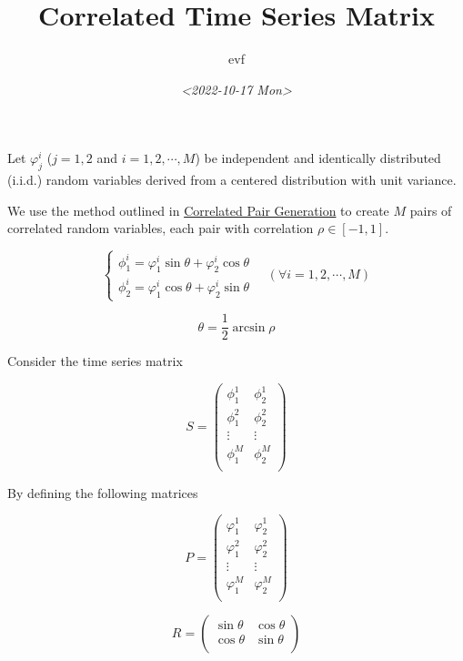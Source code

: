\documentclass[11pt]{article}
\author{evf}
\date{\textit{<2022-10-17 Mon>}}
\title{Correlated Time Series Matrix}
\begin{document}
\maketitle
\tableofcontents

Let \(\varphi_j^i\) (\(j=1,2\) and \(i=1,2,\cdots,M\)) be independent and identically distributed (i.i.d.) random variables derived from a centered distribution with unit variance.

We use the method outlined in \href{correlated\_variables.org}{Correlated Pair Generation} to create \(M\) pairs of correlated random variables, each pair with correlation \(\rho \in [-1,1]\).

\begin{equation*}
\begin{cases}
    \phi_1^i = \varphi_1^i \sin \theta + \varphi_2^i \cos \theta \\
    \phi_2^i = \varphi_1^i \cos \theta + \varphi_2^i \sin \theta
\end{cases}
\quad (\forall i = 1, 2, \cdots, M)
\end{equation*}

\[ \theta = \frac{1}{2} \arcsin \rho\]

Consider the time series matrix

\begin{equation*}
S =
\begin{pmatrix}
\phi_1^1 & \phi_2^1 \\
\phi_1^2 & \phi_2^2 \\
\vdots     & \vdots     \\
\phi_1^M & \phi_2^M \\
\end{pmatrix}
\end{equation*}

By defining the following matrices

\begin{equation*}
P =
\begin{pmatrix}
\varphi_1^1 & \varphi_2^1 \\
\varphi_1^2 & \varphi_2^2 \\
\vdots     & \vdots     \\
\varphi_1^M & \varphi_2^M \\
\end{pmatrix}
\end{equation*}

\begin{equation*}
R =
\begin{pmatrix}
\sin \theta & \cos \theta \\
\cos \theta & \sin \theta \\
\end{pmatrix}
\end{equation*}
\end{document}
